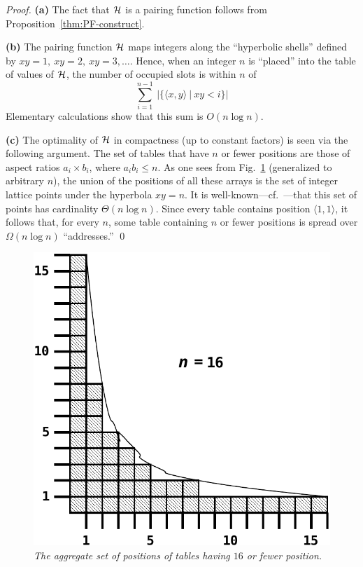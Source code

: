 \begin{proof}
{\bf (a)} The fact that $\mbox{$\cal H$}$ is a pairing function follows from
Proposition~\ref{thm:PF-construct}.

{\bf (b)}
%
The pairing function $\mbox{$\cal H$}$ maps integers along the ``hyperbolic
shells'' defined by $xy = 1, \ xy =2, \ xy=3, \ldots$.  Hence,
when an integer $n$ is ``placed'' into the table of values of
$\mbox{$\cal H$}$, the number of occupied slots is within $n$ of
\[ \sum_{i=1}^{n-1} \ |\{ \langle x,y \rangle \ | \ xy < i \}| 
\]
Elementary calculations show that this sum is $O(n \log n)$.

{\bf (c)}
%
The optimality of $\mbox{$\cal H$}$ in compactness (up to constant factors) is seen
via the following argument.  The set of tables that have $n$ or fewer
positions are those of aspect ratios $a_i \times b_i$, where $a_i b_i
\leq n$.  As one sees from Fig.~\ref{f.hyp} (generalized to arbitrary
$n$), the union of the positions of all these arrays is the set of
integer lattice points under the hyperbola $xy = n$.  It is
well-known---cf.~\cite{NivenZ80}---that this set of points has
cardinality $\Theta(n \log n)$.  Since every table contains position
$\langle 1,1 \rangle$, it follows that, for every $n$, some table
containing $n$ or fewer positions is spread over $\Omega(n \log n)$
``addresses.''   \qed
\end{proof}
\begin{figure}[htb]
\includegraphics[scale=0.4]{pairing-hyp.pdf}
\caption{{\it The aggregate set of positions of tables having $16$ or
fewer position.}
\label{f.hyp}}
\end{figure}



